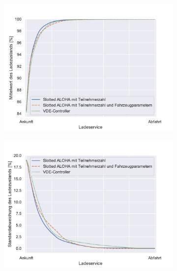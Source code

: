 \begin{figure}
	\begin{subfigure}{0.49\linewidth}
		\includegraphics[width=\linewidth]{img/ohneTrafo/SlottedAloha_participants_VDE_tau_15_soc_mean.pdf}
        \label{ABB_ot_SocMEAN}
	\end{subfigure}
	\begin{subfigure}{0.49\linewidth}
		\includegraphics[width=\linewidth]{img/ohneTrafo/SlottedAloha_participants_VDE_tau_15_soc_std.pdf}
        \label{ABB_oT_SocSTD}
	\end{subfigure}
\end{figure}

